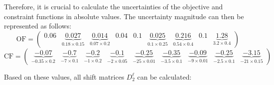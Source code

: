 \documentclass[a4paper,12pt]{article}
\begin{document}
Therefore, it is crucial to calculate the uncertainties of the objective and constraint functions in absolute values. The uncertainty magnitude can then be represented as follows:
\[
    \text{OF} = \begin{pmatrix}
        0.06 & \underbrace{0.027}_{\mathrm{0.18 \times 0.15}} & \underbrace{0.014}_{\mathrm{0.07 \times 0.2}} & 0.04 & 0.1 & \underbrace{0.025}_{\mathrm{0.1 \times 0.25}} & \underbrace{0.216}_{\mathrm{0.54 \times 0.4}} & 0.1 & \underbrace{1.28}_{\mathrm{3.2 \times 0.4}}
    \end{pmatrix}        
\]
\[
    \text{CF} = \begin{pmatrix}
        \underbrace{-0.07}_{\mathrm{-0.35 \times 0.2}} & \underbrace{-0.7}_{\mathrm{-7 \times 0.1}} & \underbrace{-0.2}_{\mathrm{-1 \times 0.2}} & \underbrace{-0.1}_{\mathrm{-2 \times 0.05}} & \underbrace{-0.25}_{\mathrm{-25 \times 0.01}} & \underbrace{-0.35}_{\mathrm{-3.5 \times 0.1}} & \underbrace{-0.09}_{\mathrm{-9 \times 0.01}} & \underbrace{-0.25}_{\mathrm{-2.5 \times 0.1}} & \underbrace{-3.15}_{\mathrm{-21 \times 0.15}}
    \end{pmatrix}
\]

Based on these values, all shift matrices $D^\ell_2$ can be calculated:
\end{document}
